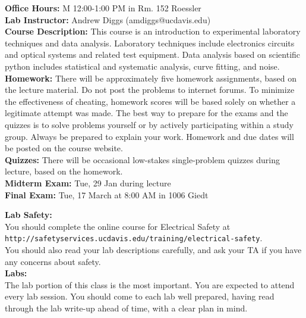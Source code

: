 \documentclass[12pt]{article}
\begin{document}
\noindent
\textbf{Office Hours:} M 12:00-1:00 PM in Rm. 152 Roessler\\

\noindent
\textbf{Lab Instructor:} Andrew Diggs (amdiggs@ucdavis.edu) \\

\noindent
\textbf {Course Description:}  
This course is an introduction to experimental laboratory techniques
and data analysis.  Laboratory techniques include electronics circuits
and optical systems and related test equipment.  Data analysis based
on scientific python includes statistical and systematic analysis,
curve fitting, and noise.\\

\noindent
\textbf{Homework:} 
There will be approximately five homework assignments, based on the
lecture material.  Do not post the problems to internet forums.  To
minimize the effectiveness of cheating, homework scores will be based
solely on whether a legitimate attempt was made.  The best way to
prepare for the exams and the quizzes is to solve problems yourself or
by actively participating within a study group.  Always be prepared to
explain your work.  Homework and due dates will be posted on the course website.\\

\noindent
\textbf{Quizzes:}  There will be occasional low-stakes single-problem quizzes during lecture, based on the homework.\\

\noindent
\textbf{Midterm Exam:} Tue, 29 Jan during lecture \\

\noindent
\textbf{Final Exam:} Tue, 17 March at 8:00 AM in 1006 Giedt \\

\newpage

\noindent
\textbf {Lab Safety:}\\
You should complete the online course for Electrical Safety at \\
{\tt http://safetyservices.ucdavis.edu/training/electrical-safety}.\\
You should also read your lab descriptions carefully, and ask your TA if you have any concerns about safety.\\

\noindent
\textbf {Labs:}\\
The lab portion of this class is the most important.  You are expected
to attend every lab session.  You should come to each lab well
prepared, having read through the lab write-up ahead of time, with a
clear plan in mind.
\end{document}

